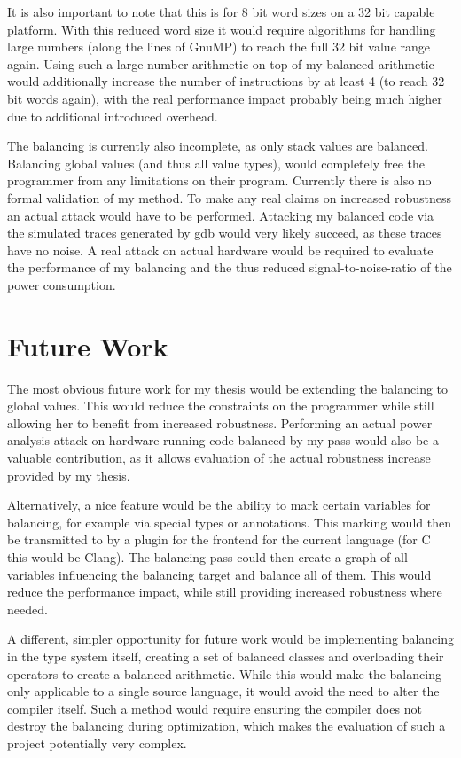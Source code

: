 It is also important to note that this is for 8 bit word sizes on a 32 bit capable platform.
With this reduced word size it would require algorithms for handling large numbers (along the lines of GnuMP\cite{granlund1996gnu}) to reach the full 32 bit value range again.
Using such a large number arithmetic on top of my balanced arithmetic would additionally increase the number of instructions by at least 4 (to reach 32 bit words again), with the real performance impact probably being much higher due to additional introduced overhead.

The balancing is currently also incomplete, as only stack values are balanced.
Balancing global values (and thus all value types), would completely free the programmer from any limitations on their program.
Currently there is also no formal validation of my method.
To make any real claims on increased robustness an actual attack would have to be performed.
Attacking my balanced code via the simulated traces generated by gdb would very likely succeed, as these traces have no noise.
A real attack on actual hardware would be required to evaluate the performance of my balancing and the thus reduced signal-to-noise-ratio of the power consumption.

\section{Future Work}
The most obvious future work for my thesis would be extending the balancing to global values.
This would reduce the constraints on the programmer while still allowing her to benefit from increased robustness.
Performing an actual power analysis attack on hardware running code balanced by my pass would also be a valuable contribution, as it allows evaluation of the actual robustness increase provided by my thesis.

Alternatively, a nice feature would be the ability to mark certain variables for balancing, for example via special types or annotations.
This marking would then be transmitted to \ir{} by a plugin for the frontend for the current language (for C this would be Clang).
The balancing pass could then create a graph of all variables influencing the balancing target and balance all of them.
This would reduce the performance impact, while still providing increased robustness where needed.

A different, simpler opportunity for future work would be implementing balancing in the type system itself, creating a set of balanced classes and overloading their operators to create a balanced arithmetic.
While this would make the balancing only applicable to a single source language, it would avoid the need to alter the compiler itself.
Such a method would require ensuring the compiler does not destroy the balancing during optimization, which makes the evaluation of such a project potentially very complex.

